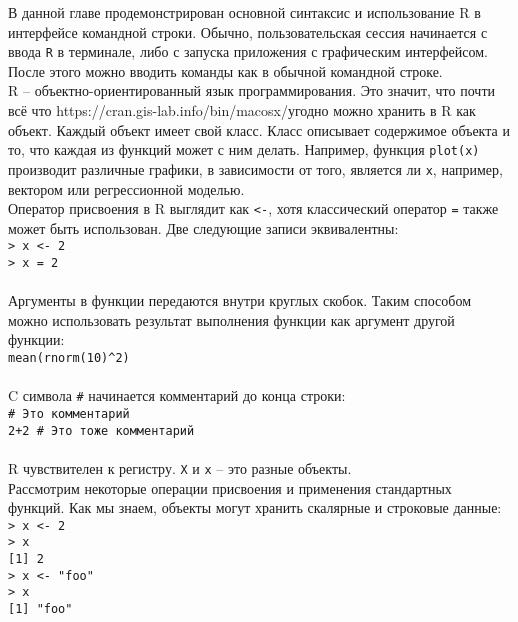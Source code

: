    В данной главе продемонстрирован основной синтаксис и использование R в интерфейсе 
    командной строки. Обычно, пользовательская сессия начинается с ввода \texttt{R} в 
    терминале, либо с запуска приложения с графическим интерфейсом. После этого можно вводить
    команды как в обычной командной строке.\\

    \indent R -- объектно-ориентированный язык программирования. Это значит, что почти всё что 
    https://cran.gis-lab.info/bin/macosx/угодно можно хранить в R как объект. Каждый объект имеет свой класс. Класс описывает
    содержимое объекта и то, что каждая из функций может с ним делать. Например, функция
    \texttt{plot(x)} производит различные графики, в зависимости от того, является ли 
    \texttt{x}, например, вектором или регрессионной моделью. \\
    
    \indent Оператор присвоения в R выглядит как \texttt{<-}, хотя классический оператор \texttt{=}
    также может быть использован. Две следующие записи эквивалентны: \\
    \indent \texttt{> x <- 2} \\
    \indent \texttt{> x = 2} \\ \\
    
    \indent Аргументы в функции передаются внутри круглых скобок. Таким способом можно использовать 
    результат выполнения функции как аргумент другой функции: \\
    \indent \texttt{mean(rnorm(10)\^{}2)} \\ \\
    
    \indent C символа \texttt{\#} начинается комментарий до конца строки: \\
    \indent \texttt{\# Это комментарий} \\
    \indent \texttt{2+2 \# Это тоже комментарий} \\ \\
    
    \indent R чувствителен к регистру. \texttt{X} и \texttt{x} -- это разные объекты. \\
    
    \indent Рассмотрим некоторые операции присвоения и применения стандартных функций. Как мы
    знаем, объекты могут хранить скалярные и строковые данные: \\
    \indent \texttt{> x <- 2} \\
    \indent \texttt{> x} \\
    \indent \texttt{[1] 2} \\
    \indent \texttt{> x <- "foo"} \\
    \indent \texttt{> x } \\
    \indent \texttt{[1] "foo"} \\ \\
    
